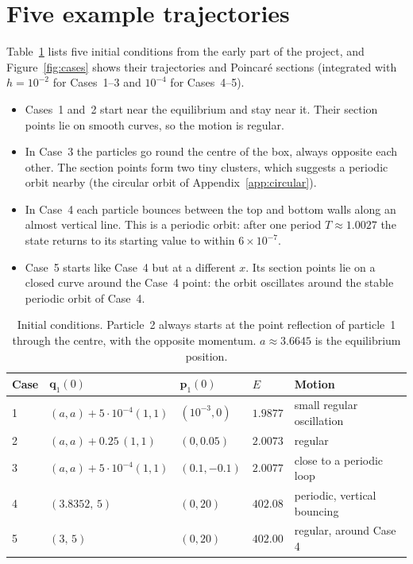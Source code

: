 \documentclass[11pt,a4paper]{article}
\newcommand{\q}{\mathbf{q}}
\newcommand{\p}{\mathbf{p}}
\begin{document}
\section{Five example trajectories}\label{app:cases}
Table~\ref{tab:cases} lists five initial conditions from the early part of
the project, and Figure~\ref{fig:cases} shows their trajectories and
Poincar\'e sections (integrated with $h=10^{-2}$ for Cases~1--3 and $10^{-4}$
for Cases~4--5).
\begin{itemize}
  \item Cases~1 and~2 start near the equilibrium and stay near it. Their
        section points lie on smooth curves, so the motion is regular.
  \item In Case~3 the particles go round the centre of the box, always
        opposite each other. The section points form two tiny clusters, which
        suggests a periodic orbit nearby (the circular orbit of
        Appendix~\ref{app:circular}).
  \item In Case~4 each particle bounces between the top and bottom walls along
        an almost vertical line. This is a periodic orbit: after one period
        $T\approx1.0027$ the state returns to its starting value to within
        $6\times10^{-7}$.
  \item Case~5 starts like Case~4 but at a different $x$. Its section points
        lie on a closed curve around the Case~4 point: the orbit oscillates
        around the stable periodic orbit of Case~4.
\end{itemize}

\begin{table}
\centering
\caption{Initial conditions. Particle~2 always starts at the point reflection
of particle~1 through the centre, with the opposite momentum. $a\approx3.6645$
is the equilibrium position.}
\vspace{1em}
\label{tab:cases}
\begin{tabular}{@{}lllll@{}}
\toprule
Case & $\q_1(0)$ & $\p_1(0)$ & $E$ & Motion\\
\midrule
1 & $(a,a)+5\cdot10^{-4}(1,1)$ & $(10^{-3},0)$ & $1.9877$ & small regular oscillation\\
2 & $(a,a)+0.25\,(1,1)$ & $(0,0.05)$ & $2.0073$ & regular\\
3 & $(a,a)+5\cdot10^{-4}(1,1)$ & $(0.1,-0.1)$ & $2.0077$ & close to a periodic loop\\
4 & $(3.8352,\,5)$ & $(0,20)$ & $402.08$ & periodic, vertical bouncing\\
5 & $(3,\,5)$ & $(0,20)$ & $402.00$ & regular, around Case 4\\
\bottomrule
\end{tabular}
\end{table}
\end{document}
